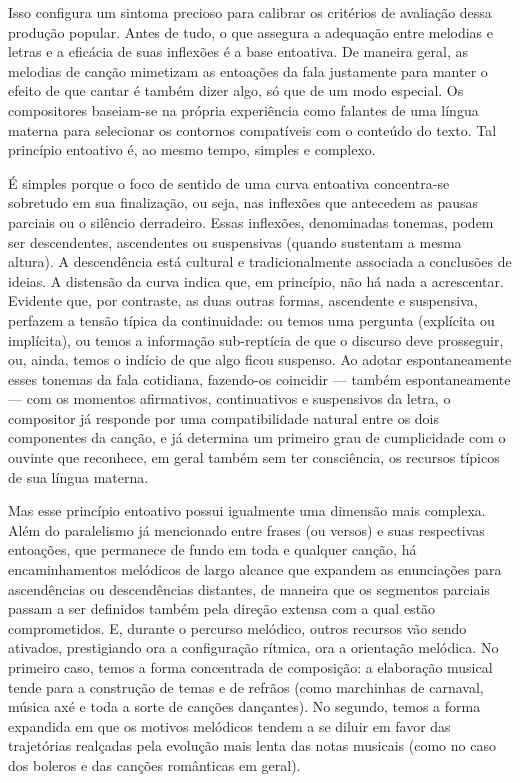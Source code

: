 Isso configura um sintoma precioso para calibrar os critérios de
avaliação dessa produção popular. Antes de tudo, o que assegura a
adequação entre melodias e letras e a eficácia de suas inflexões é a
base entoativa. De maneira geral, as melodias de canção mimetizam as
entoações da fala justamente para manter o efeito de que cantar é também
dizer algo, só que de um modo especial. Os compositores baseiam-se na
própria experiência como falantes de uma língua materna para selecionar
os contornos compatíveis com o conteúdo do texto. Tal princípio
entoativo é, ao mesmo tempo, simples e complexo.

É simples porque o foco de sentido de uma curva entoativa concentra-se
sobretudo em sua finalização, ou seja, nas inflexões que antecedem as
pausas parciais ou o silêncio derradeiro. Essas inflexões, denominadas
tonemas, podem ser descendentes, ascendentes ou suspensivas (quando
sustentam a mesma altura). A descendência está cultural e
tradicionalmente associada a conclusões de ideias. A distensão da curva
indica que, em princípio, não há nada a acrescentar. Evidente que, por
contraste, as duas outras formas, ascendente e suspensiva, perfazem a
tensão típica da continuidade: ou temos uma pergunta (explícita ou
implícita), ou temos a informação sub-reptícia de que o discurso deve
prosseguir, ou, ainda, temos o indício de que algo ficou suspenso. Ao
adotar espontaneamente esses tonemas da fala cotidiana, fazendo-os
coincidir --- também espontaneamente --- com os momentos afirmativos,
continuativos e suspensivos da letra, o compositor já responde por uma
compatibilidade natural entre os dois componentes da canção, e já
determina um primeiro grau de cumplicidade com o ouvinte que reconhece,
em geral também sem ter consciência, os recursos típicos de sua língua
materna.

Mas esse princípio entoativo possui igualmente uma dimensão mais
complexa. Além do paralelismo já mencionado entre frases (ou versos) e
suas respectivas entoações, que permanece de fundo em toda e qualquer
canção, há encaminhamentos melódicos de largo alcance que expandem as
enunciações para ascendências ou descendências distantes, de maneira que
os segmentos parciais passam a ser definidos também pela direção extensa
com a qual estão comprometidos. E, durante o percurso melódico, outros
recursos vão sendo ativados, prestigiando ora a configuração rítmica,
ora a orientação melódica. No primeiro caso, temos a forma concentrada
de composição: a elaboração musical tende para a construção de temas e
de refrãos (como marchinhas de carnaval, música axé e toda a sorte de
canções dançantes). No segundo, temos a forma expandida em que os
motivos melódicos tendem a se diluir em favor das trajetórias realçadas
pela evolução mais lenta das notas musicais (como no caso dos boleros e
das canções românticas em geral).

